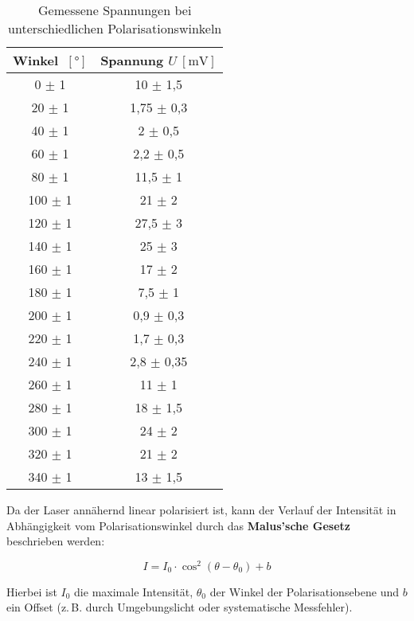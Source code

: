 \begin{table}[htbp]
    \centering
    \begin{tabular}{c|c}
        Winkel \(~[\text{°}]\) & Spannung \(U~[\text{mV}]\) \\
        \hline
        0 \(\pm\) 1 & 10 \(\pm\) 1{,}5 \\
        20 \(\pm\) 1 & 1{,}75 \(\pm\) 0{,}3 \\
        40 \(\pm\) 1 & 2 \(\pm\) 0{,}5 \\
        60 \(\pm\) 1 & 2{,}2 \(\pm\) 0{,}5 \\
        80 \(\pm\) 1 & 11{,}5 \(\pm\) 1 \\
        100 \(\pm\) 1 & 21 \(\pm\) 2 \\
        120 \(\pm\) 1 & 27{,}5 \(\pm\) 3 \\
        140 \(\pm\) 1 & 25 \(\pm\) 3 \\
        160 \(\pm\) 1 & 17 \(\pm\) 2 \\
        180 \(\pm\) 1 & 7{,}5 \(\pm\) 1 \\
        200 \(\pm\) 1 & 0{,}9 \(\pm\) 0{,}3 \\
        220 \(\pm\) 1 & 1{,}7 \(\pm\) 0{,}3 \\
        240 \(\pm\) 1 & 2{,}8 \(\pm\) 0{,}35 \\
        260 \(\pm\) 1 & 11 \(\pm\) 1 \\
        280 \(\pm\) 1 & 18 \(\pm\) 1{,}5 \\
        300 \(\pm\) 1 & 24 \(\pm\) 2 \\
        320 \(\pm\) 1 & 21 \(\pm\) 2 \\
        340 \(\pm\) 1 & 13 \(\pm\) 1{,}5 \\
    \end{tabular}
    \caption{Gemessene Spannungen bei unterschiedlichen Polarisationswinkeln}
    \label{tab:Wellenlaenge}
\end{table}

Da der Laser annähernd linear polarisiert ist, kann der Verlauf der Intensität in Abhängigkeit vom Polarisationswinkel durch das \textbf{Malus’sche Gesetz} beschrieben werden:

\begin{equation*}
    I = I_0 \cdot \cos^2(\theta - \theta_0) + b
\end{equation*}

Hierbei ist $I_0$ die maximale Intensität, $\theta_0$ der Winkel der Polarisationsebene und $b$ ein Offset (z.\,B. durch Umgebungslicht oder systematische Messfehler).

